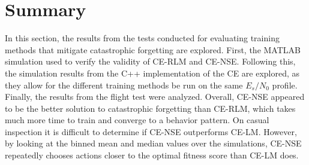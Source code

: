\clearpage

\section{Summary}
\par In this section, the results from the tests conducted for evaluating training methods that mitigate catastrophic forgetting are explored. First, the MATLAB simulation used to verify the validity of CE-RLM and CE-NSE. Following this, the simulation results from the C++ implementation of the CE are explored, as they allow for the different training methods be run on the same $E_s/N_0$ profile. Finally, the results from the flight test were analyzed. Overall, CE-NSE appeared to be the better solution to catastrophic forgetting than CE-RLM, which takes much more time to train and converge to a behavior pattern. On casual inspection it is difficult to determine if CE-NSE outperforms CE-LM. However, by looking at the binned mean and median values over the simulations, CE-NSE repeatedly chooses actions closer to the optimal fitness score than CE-LM does.

